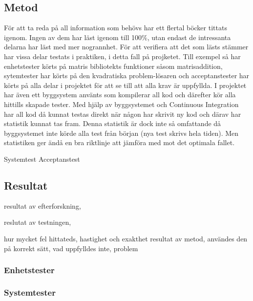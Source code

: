 	\subsection{Metod}
	För att ta reda på all information som behövs har ett flertal böcker tittats igenom. Ingen av dem har läst igenom till 100\%, utan endast de intressanta delarna har läst med mer nogrannhet. För att verifiera att det som lästs stämmer har vissa delar testats i praktiken, i detta fall på projketet. Till exempel så har enhetstester körts på matris bibliotekts funktioner såsom matrisaddition, sytemtester har körts på den kvadratiska problem-lösaren och acceptanstester har körts på alla delar i projektet för att se till att alla krav är uppfyllda.\newline
	I projektet har även ett byggsystem använts som kompilerar all kod och därefter kör alla hittills skapade tester. Med hjälp av byggsystemet och Continuous Integration har all kod då kunnat testas direkt när någon har skrivit ny kod och därav har statistik kunnat tas fram. Denna statistik är dock inte så omfattande då byggsystemet inte körde alla test från början (nya test skrivs hela tiden). Men statistiken ger ändå en bra riktlinje att jämföra med mot det optimala fallet.
	
	Systemtest
	Acceptanstest
	
	
	
	\subsection{Resultat}	
	resultat av efterforskning, \newline
	
	reslutat av testningen, \newline
	
	hur mycket fel hittateds, \newline
	hastighet och exakthet\newline
	resultat av metod, \newline
	användes den på korrekt sätt, \newline
	vad uppfylldes inte, \newline
	problem\newline
	
	\subsubsection{Enhetstester}
	\subsubsection{Systemtester}
